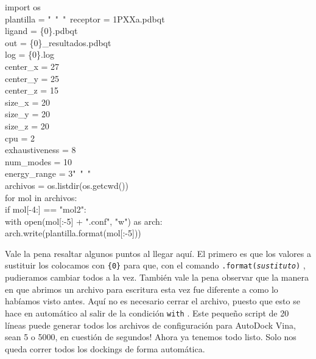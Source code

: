 \documentclass[10pt,letterpaper]{article}
\newcommand{\inlinecode}[1]{
\colorbox{light-gray}{\texttt{#1}}
}
\newenvironment{Code}
{
\begin{lrbox}{\selvestebox}%
\begin{minipage}{\dimexpr\columnwidth-2\fboxsep\relax}
\fontfamily{\ttdefault}\selectfont
}
{\end{minipage}\end{lrbox}%
\begin{center}
\colorbox{light-gray}{\usebox{\selvestebox}}
\end{center}
}
\begin{document}
\begin{footnotesize}
\begin{Code}
import os\\
plantilla = "\ \hspace*{-1.5mm}"\ \hspace*{-1.5mm}"\ \hspace*{-1.5mm}receptor = 1PXXa.pdbqt\\
ligand = \{0\}.pdbqt\\
out = \{0\}\_resultados.pdbqt\\
log = \{0\}.log\\
center\_x = 27\\
center\_y = 25\\
center\_z = 15\\
size\_x = 20\\
size\_y = 20\\
size\_z = 20\\
cpu = 2\\
exhaustiveness = 8\\
num\_modes = 10\\
energy\_range = 3"\ \hspace*{-1.5mm}"\ \hspace*{-1.5mm}"\\
archivos = os.listdir(os.getcwd())\\
for mol in archivos:\\
\hspace*{6mm}if mol[-4:] == "mol2":\\
\hspace*{12mm}with open(mol[:-5] + ".conf", "w") as arch:\\
\hspace*{18mm}arch.write(plantilla.format(mol[:-5]))
\end{Code}
\end{footnotesize}

Vale la pena resaltar algunos puntos al llegar aqu\'i. El primero es que los valores a sustituir los colocamos con \inlinecode{\{0\}} para que, con el comando \inlinecode{.format(\emph{sustituto})}, pudieramos cambiar todos a la vez. Tambi\'en vale la pena observar que la manera en que abrimos un archivo para escritura esta vez fue diferente a como lo hab\'iamos visto antes. Aqu\'i no es necesario cerrar el archivo, puesto que esto se hace en autom\'atico al salir de la condici\'on \inlinecode{with}. Este peque\~no script de 20 l\'ineas puede generar todos los archivos de configuraci\'on para AutoDock Vina, sean 5 o 5000, en cuesti\'on de segundos! Ahora ya tenemos todo listo. Solo nos queda correr todos los dockings de forma autom\'atica.\\
\end{document}
